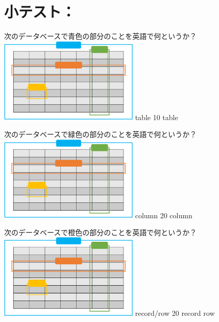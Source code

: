 \newcommand{\Release}{}%
\newcommand{\Slide}{}%
\newcommand{\PrintLecture}{1}%
\newcommand{\PrintSolution}{1}%







\section{小テスト： \MyClass}

\begin{quiz}{\MyClass}

\QuizShortAnswer
{
  次のデータベースで青色の部分のことを英語で何というか？
  \includegraphics[width=0.5\textwidth]{quiz/table_names_quiz.png}
}
{
  table
}
{10}
{table}
{}
{}
{}

\QuizShortAnswer
{
  次のデータベースで緑色の部分のことを英語で何というか？
  \includegraphics[width=0.5\textwidth]{quiz/table_names_quiz.png}
}
{
  column
}
{20}
{column}
{}
{}
{}

\QuizShortAnswer
{
  次のデータベースで橙色の部分のことを英語で何というか？
  \includegraphics[width=0.5\textwidth]{quiz/table_names_quiz.png}
}
{
  record/row
}
{20}
{record}
{row}
{}
{}


\end{quiz}
